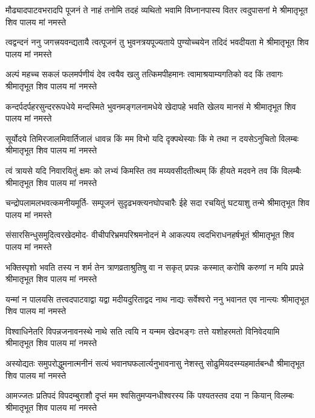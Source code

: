 \fourlineindentedshloka
{मौढ्यादपाटवभरादपि पूजनं ते}
{नाहं तनोमि तदहं व्यथितो भवामि}
{विघ्नानपास्य वितर त्वदुपासनां मे}
{श्रीमातृभूत शिव पालय मां नमस्ते} %

\fourlineindentedshloka
{त्वद्वन्दनं ननु जगत्त्रयवन्द्यतायै}
{त्वत्पूजनं तु भुवनत्रयपूज्यताये}
{पुण्योच्चयेन तदिदं भवदीयता मे}
{श्रीमातृभूत शिव पालय मां नमस्ते} %

\fourlineindentedshloka
{अल्पं महच्च सकलं फलमर्पणीयं}
{देव त्वयैव खलु तत्किमपीहमानः}
{त्वामाश्रयाम्यगतिको वद किं तवागः}
{श्रीमातृभूत शिव पालय मां नमस्ते} %

\fourlineindentedshloka
{कन्दर्पदर्पहरसुन्दररूपधेये}
{मन्दस्मिते भुवनमङ्गलनामधेये}
{खेदापहे भवति खेलय मानसं मे}
{श्रीमातृभूत शिव पालय मां नमस्ते} %

\fourlineindentedshloka
{सूर्योदये तिमिरजालमिवार्तिजालं}
{धावन्न किं मम विभो यदि दृक्पथेस्याः}
{किं मे तथा न दयसेऽनुचितो विलम्बः}
{श्रीमातृभूत शिव पालय मां नमस्ते} %

\fourlineindentedshloka
{त्वं त्रायसे यदि निवारयितुं क्षमः को}
{लभ्यं किमस्ति तव मय्यवसीदतीत्थम्}
{किं हीयते मदवने तव किं विलम्बैः}
{श्रीमातृभूत शिव पालय मां नमस्ते} %

\fourlineindentedshloka
{चन्द्रोपलामलभवत्कमनीयमूर्ति-}
{सम्पूजनं सुदृढभक्त्यनघोपचारैः}
{ईहे सदा रचयितुं घटयाशु तन्मे}
{श्रीमातृभूत शिव पालय मां नमस्ते} %

\fourlineindentedshloka
{संसारसिन्धुसमुदित्वरखेदमोद-}
{वीचीपरिभ्रमपरिश्रमनोदनं मे}
{आकल्पय त्वदभिराधनहर्षभूतं}
{श्रीमातृभूत शिव पालय मां नमस्ते} %

\fourlineindentedshloka
{भक्तिस्पृशो भवति तस्य न शर्म तेन}
{त्राणव्रताश्रुतिषु वा न सकृत् प्रपन्नः}
{कस्मात् करोषि करुणां न मयि प्रपन्ने}
{श्रीमातृभूत शिव पालय मां नमस्ते} %

\fourlineindentedshloka
{यन्मां न पालयसि तत्त्वदपाटवाद्वा}
{यद्वा मदीयदुरिताद्वद नाथ नाद्यः}
{सर्वेश्वरो ननु भवानत एव नान्त्यः}
{श्रीमातृभूत शिव पालय मां नमस्ते} %

\fourlineindentedshloka
{विश्वाधिनेतरि विपन्नजनावनस्थे}
{नाथे सति त्वयि न यन्मम खेदभङ्गः}
{तत्ते यशोहरमतो विनिवेदयामि}
{श्रीमातृभूत शिव पालय मां नमस्ते} %

\fourlineindentedshloka
{अस्योद्यतः समुपरोद्धुमनात्मनीनं}
{सत्यं भवानघफलार्त्यनुभावनासु}
{नेशस्तु सोढुमियदस्म्यहमार्तबन्धौ}
{श्रीमातृभूत शिव पालय मां नमस्ते} %

\fourlineindentedshloka
{आमज्जतः प्रतिपदं विपदम्बुराशौ}
{दृप्तं मम श्वसितुमप्यनधीश्वरस्य}
{किं पश्यतस्तव दया न कियान् विलम्बः}
{श्रीमातृभूत शिव पालय मां नमस्ते} %

